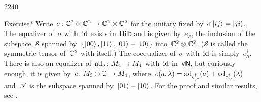 \begin{parsec}{2240}
\begin{point}{70}{Exercise*}
Write~$\sigma\colon \mathbb{C}^2 \otimes \mathbb{C}^2 \to \mathbb{C}^2 \otimes \mathbb{C}^2$
    for the unitary
    fixed by~$\sigma \ket{ij} = \ket{ji}$.
The equalizer of~$\sigma$ with~$\mathrm{id}$ exists in~$\mathsf{Hilb}$
    and is given by~$e_{\mathscr{S}}$, the inclusion
    of the subspace~$\mathscr{S}$
    spanned by~$\{\ket{00}, \ket{11}, \ket{01}+\ket{10}\}$
    into~$\mathbb{C}^2\otimes \mathbb{C}^2$.
    ($\mathscr{S}$ is called the symmetric tensor of~$\mathbb{C}^2$ with itself.)
    The coequalizer of~$\sigma$ with~$\mathrm{id}$ is simply~$e_{\mathscr{S}}^\dagger$.
    There is also an equalizer of~$\mathrm{ad}_{\sigma}\colon M_4 \to M_4$ with~$\mathrm{id}$
    in~$\mathsf{vN}$, but curiously enough, it is given
    by~$e \colon M_3 \oplus \mathbb{C} \to M_4$,
    where~$e(a,\lambda) =
            \mathrm{ad}_{e^\dagger_{\mathscr{S}}}(a) +
            \mathrm{ad}_{e^\dagger_{\mathscr{A}}}(\lambda)$
     and~$\mathscr{A}$ is the subspace spanned by~$\ket{01} - \ket{10}$.
     For the proof and similar results, see \cite{bags}.


\end{point}
\end{parsec}
